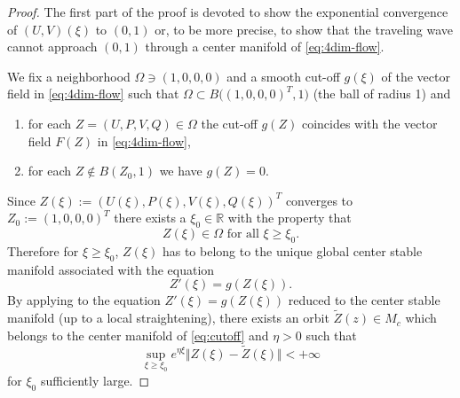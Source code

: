 \documentclass[11pt,a4paper]{article}
\numberwithin{equation}{section}
\numberwithin{figure}{section}
\begin{document}
\begin{proof}
    The first part of the proof is devoted to show the exponential convergence of $(U, V)(\xi)$ to  $(0, 1)$ or, to be more precise, to show that the traveling wave cannot approach $(0, 1)$ through a center manifold of \eqref{eq:4dim-flow}.  

    We fix a neighborhood $\Omega\ni (1, 0, 0, 0)$ and a smooth cut-off $g(\xi)$ of the vector field in \eqref{eq:4dim-flow} such that $\Omega \subset B\big((1, 0, 0, 0)^T, 1\big) $ (the ball of radius 1) and 
    \begin{enumerate} 
        \item for each $ Z=(U, P, V, Q)\in \Omega$ the cut-off $g(Z)$ coincides with the vector field $F(Z)$ in \eqref{eq:4dim-flow}, 
        \item for each $ Z \not\in B(Z_0, 1)$ we have $g(Z)=0$.
    \end{enumerate}
    Since $Z(\xi):=(U(\xi), P(\xi), V(\xi), Q(\xi))^T$ converges to $Z_0:=(1, 0, 0, 0)^T$ there exists a $\xi_0\in\mathbb R$ with the property that 
    \begin{equation*}
        Z(\xi)\in \Omega \text{ for all } \xi\geq \xi_0.
    \end{equation*}
    Therefore for $\xi\geq \xi_0$, $Z(\xi)$ has to belong to the unique global center stable manifold associated with the equation 
    \begin{equation} \label{eq:cutoff}
        Z'(\xi)=g(Z(\xi)).
    \end{equation}
    By applying \cite[Theorem 5.17]{Van-89} to the equation $Z'(\xi)=g(Z(\xi))$ reduced to the center stable manifold (up to a local straightening), there exists an orbit $\tilde Z(z)\in M_c$ which belongs to the center manifold of \eqref{eq:cutoff}  and $\eta>0$ such that 
    \begin{equation}\label{eq:proofpropinvadeda=1-1}
        \sup_{\xi\geq \xi_0} e^{\eta \xi}\Vert Z(\xi) -\tilde Z(\xi)\Vert < +\infty
    \end{equation}
    for $\xi_0$ sufficiently large. 
    

\end{proof}
\end{document}
